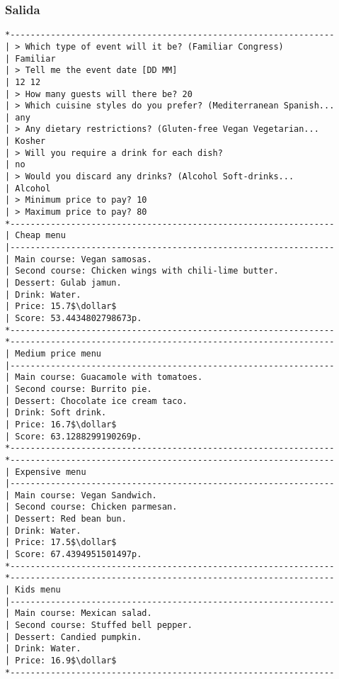 \documentclass{article}
\newcommand{\dollar}{\mbox{\textdollar}}
\begin{document}
\subsubsection{Salida}
\begin{lstlisting}
*----------------------------------------------------------------
| > Which type of event will it be? (Familiar Congress)
| Familiar
| > Tell me the event date [DD MM]
| 12 12
| > How many guests will there be? 20
| > Which cuisine styles do you prefer? (Mediterranean Spanish...
| any
| > Any dietary restrictions? (Gluten-free Vegan Vegetarian...
| Kosher
| > Will you require a drink for each dish?
| no
| > Would you discard any drinks? (Alcohol Soft-drinks...
| Alcohol
| > Minimum price to pay? 10
| > Maximum price to pay? 80
*----------------------------------------------------------------
| Cheap menu
|----------------------------------------------------------------
| Main course: Vegan samosas.
| Second course: Chicken wings with chili-lime butter.
| Dessert: Gulab jamun.
| Drink: Water.
| Price: 15.7$\dollar$
| Score: 53.4434802798673p.
*----------------------------------------------------------------
*----------------------------------------------------------------
| Medium price menu
|----------------------------------------------------------------
| Main course: Guacamole with tomatoes.
| Second course: Burrito pie.
| Dessert: Chocolate ice cream taco.
| Drink: Soft drink.
| Price: 16.7$\dollar$
| Score: 63.1288299190269p.
*----------------------------------------------------------------
*----------------------------------------------------------------
| Expensive menu
|----------------------------------------------------------------
| Main course: Vegan Sandwich.
| Second course: Chicken parmesan.
| Dessert: Red bean bun.
| Drink: Water.
| Price: 17.5$\dollar$
| Score: 67.4394951501497p.
*----------------------------------------------------------------
*----------------------------------------------------------------
| Kids menu
|----------------------------------------------------------------
| Main course: Mexican salad.
| Second course: Stuffed bell pepper.
| Dessert: Candied pumpkin.
| Drink: Water.
| Price: 16.9$\dollar$
*----------------------------------------------------------------
\end{lstlisting}
\end{document}
